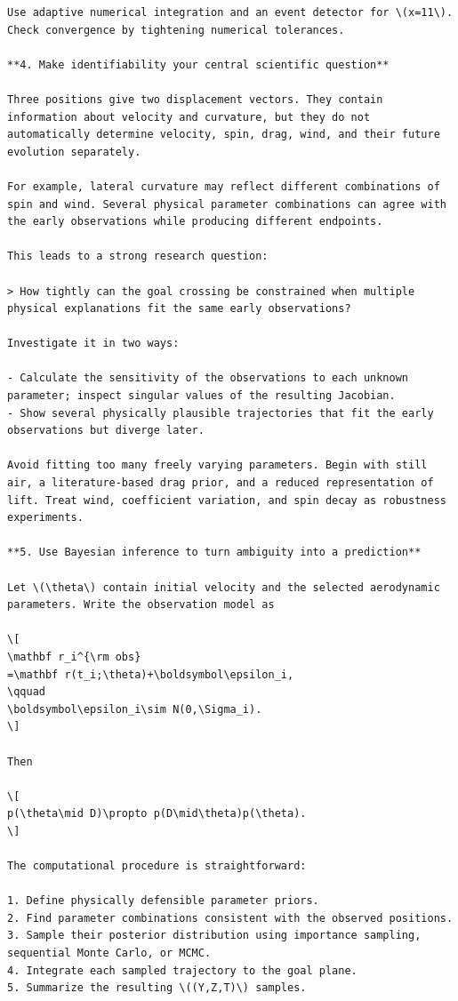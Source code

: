 \documentclass[UTF8,10pt]{ctexart}
\begin{document}
\begin{Verbatim}[breaklines=true,breakanywhere=true,fontsize=\scriptsize,frame=single,framesep=2pt]
Use adaptive numerical integration and an event detector for \(x=11\). Check convergence by tightening numerical tolerances.

**4. Make identifiability your central scientific question**

Three positions give two displacement vectors. They contain information about velocity and curvature, but they do not automatically determine velocity, spin, drag, wind, and their future evolution separately.

For example, lateral curvature may reflect different combinations of spin and wind. Several physical parameter combinations can agree with the early observations while producing different endpoints.

This leads to a strong research question:

> How tightly can the goal crossing be constrained when multiple physical explanations fit the same early observations?

Investigate it in two ways:

- Calculate the sensitivity of the observations to each unknown parameter; inspect singular values of the resulting Jacobian.
- Show several physically plausible trajectories that fit the early observations but diverge later.

Avoid fitting too many freely varying parameters. Begin with still air, a literature-based drag prior, and a reduced representation of lift. Treat wind, coefficient variation, and spin decay as robustness experiments.

**5. Use Bayesian inference to turn ambiguity into a prediction**

Let \(\theta\) contain initial velocity and the selected aerodynamic parameters. Write the observation model as

\[
\mathbf r_i^{\rm obs}
=\mathbf r(t_i;\theta)+\boldsymbol\epsilon_i,
\qquad
\boldsymbol\epsilon_i\sim N(0,\Sigma_i).
\]

Then

\[
p(\theta\mid D)\propto p(D\mid\theta)p(\theta).
\]

The computational procedure is straightforward:

1. Define physically defensible parameter priors.
2. Find parameter combinations consistent with the observed positions.
3. Sample their posterior distribution using importance sampling, sequential Monte Carlo, or MCMC.
4. Integrate each sampled trajectory to the goal plane.
5. Summarize the resulting \((Y,Z,T)\) samples.


\end{Verbatim}
\end{document}
